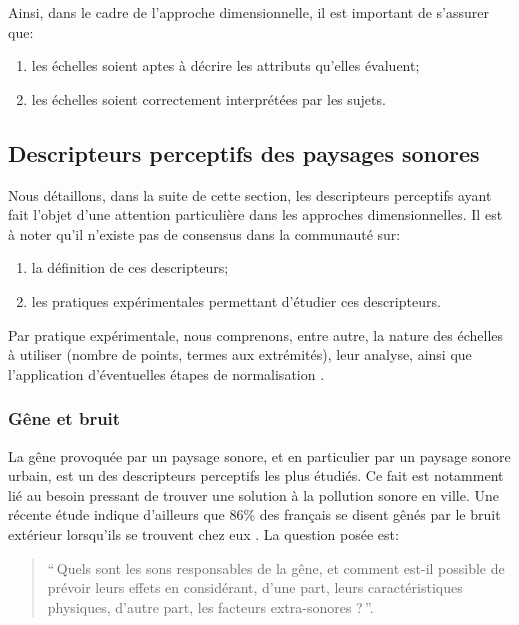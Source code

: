 Ainsi, dans le cadre de l'approche dimensionnelle, il est important de s'assurer que:

\begin{enumerate}
\item les échelles soient aptes à décrire les attributs qu'elles évaluent;
\item les échelles soient correctement interprétées par les sujets.
\end{enumerate}

\subsection{Descripteurs perceptifs des paysages sonores}
\label{sec:descripteursPercetifs}

Nous détaillons, dans la suite de cette section, les descripteurs perceptifs ayant fait l'objet d'une attention particulière dans les approches dimensionnelles. Il est à noter qu'il n'existe pas de consensus dans la communauté sur:

\begin{enumerate}
\item la définition de ces descripteurs; 
\item les pratiques expérimentales permettant d'étudier ces descripteurs.
\end{enumerate}

Par pratique expérimentale, nous comprenons, entre autre, la nature des échelles à utiliser (nombre de points, termes aux extrémités), leur analyse, ainsi que l'application d'éventuelles étapes de normalisation \citep{aletta2016soundscape}.

\subsubsection{Gêne et bruit}

La gêne provoquée par un paysage sonore, et en particulier par un paysage sonore urbain, est un des descripteurs perceptifs les plus étudiés. Ce fait est notamment lié au besoin pressant de trouver une solution à la pollution sonore en ville. Une récente étude indique d'ailleurs que 86\% des français se disent gênés par le bruit extérieur lorsqu'ils se trouvent chez eux \citep{noiseFrench}. La question posée est: \\

\begin{quote}
``\,Quels sont les sons responsables de la gêne, et comment est-il possible de prévoir leurs effets en considérant, d'une part, leurs caractéristiques physiques, d'autre part, les facteurs extra-sonores ?\,''.
\end{quote}

